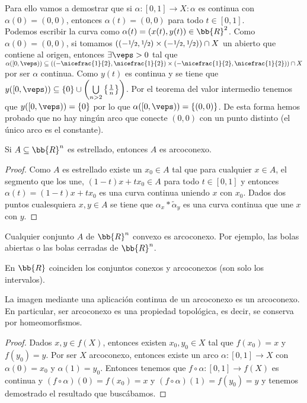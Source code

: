 \begin{ejemplo}
    Para ello vamos a demostrar que si $\alpha:[0,1]\to X : \alpha$ es continua con $\alpha(0)=(0,0)$, entonces $\alpha(t)=(0,0)$ para todo $t\in [0,1]$.\\

    Podemos escribir la curva como $\alpha(t) = (x(t), y(t))\in \bb{R}^2$. Como $\alpha(0)=(0,0)$, si tomamos $((-\nicefrac{1}{2}, \nicefrac{1}{2})\times (-\nicefrac{1}{2}, \nicefrac{1}{2})) \cap X$ un abierto que contiene al origen, entonces $\exists \veps > 0$ tal que $\alpha([0,\veps))\subseteq ((-\nicefrac{1}{2}, \nicefrac{1}{2})\times (-\nicefrac{1}{2}, \nicefrac{1}{2})) \cap X$ por ser $\alpha$ continua. Como $y(t)$ es continua y se tiene que $y([0,\veps))\subseteq \{0\}\cup\left(\bigcup\limits_{n>2} \left\{\frac{1}{n}\right\}\right)$. Por el teorema del valor intermedio tenemos que $y([0,\veps)) = \{0\}$ por lo que $\alpha([0,\veps))=\{(0,0)\}$. De esta forma hemos probado que no hay ningún arco que conecte $(0,0)$ con un punto distinto (el único arco es el constante).
\end{ejemplo}

\begin{teo}
    Si $A\subseteq \bb{R}^n$ es estrellado, entonces $A$ es arcoconexo.
    \begin{proof}
        Como $A$ es estrellado existe un $x_0\in A$ tal que para cualquier $x\in A$, el segmento que los une, $(1-t)x + tx_0\in A$ para todo $t\in [0,1]$ y entonces $\alpha(t)=(1-t)x+tx_0$ es una curva continua uniendo $x$ con $x_0$. Dados dos puntos cualesquiera $x,y \in A$ se tiene que $\alpha_x\ast \tilde{\alpha}_y$ es una curva continua que une $x$ con $y$.
    \end{proof}
\end{teo}

\begin{coro}
    Cualquier conjunto $A$ de $\bb{R}^n$ convexo es arcoconexo. Por ejemplo, las bolas abiertas o las bolas cerradas de $\bb{R}^n$.
\end{coro}

\begin{coro}
    En $\bb{R}$ coinciden los conjuntos conexos y arcoconexos (son solo los intervalos).
\end{coro}

\begin{teo}
    La imagen mediante una aplicación continua de un arcoconexo es un arcoconexo. En particular, ser arcoconexo es una propiedad topológica, es decir, se conserva por homeomorfismos.
    \begin{proof}
        Dados $x,y\in f(X)$, entonces existen $x_0,y_0\in X$ tal que $f(x_0)=x$ y $f(y_0) = y$. Por ser $X$ arcoconexo, entonces existe un arco $\alpha:[0,1]\to X$ con $\alpha(0)=x_0$ y $\alpha(1)=y_0$. Entonces tenemos que $f\circ \alpha: [0,1]\to f(X)$ es continua y $(f\circ \alpha)(0) = f(x_0) = x$ y $(f\circ\alpha)(1) = f(y_0) = y$ y tenemos demostrado el resultado que buscábamos.
    \end{proof}
\end{teo}

